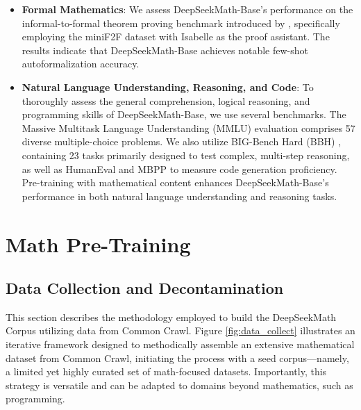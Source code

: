 \begin{itemize}[topsep=0pt]
\item \textbf{Formal Mathematics}: We assess DeepSeekMath-Base’s performance on the informal-to-formal theorem proving benchmark introduced by \citep{dsp_proof}, specifically employing the miniF2F dataset \citep{minif2f} with Isabelle \citep{isabelle} as the proof assistant. The results indicate that DeepSeekMath-Base achieves notable few-shot autoformalization accuracy.
\item \textbf{Natural Language Understanding, Reasoning, and Code}: To thoroughly assess the general comprehension, logical reasoning, and programming skills of DeepSeekMath-Base, we use several benchmarks. The Massive Multitask Language Understanding (MMLU) evaluation \citep{mmlu} comprises 57 diverse multiple-choice problems. We also utilize BIG-Bench Hard (BBH) \citep{bbh}, containing 23 tasks primarily designed to test complex, multi-step reasoning, as well as HumanEval \citep{codex} and MBPP \citep{mbpp} to measure code generation proficiency. Pre-training with mathematical content enhances DeepSeekMath-Base’s performance in both natural language understanding and reasoning tasks.
\end{itemize}

\section{Math Pre-Training}

\subsection{Data Collection and Decontamination} This section describes the methodology employed to build the DeepSeekMath Corpus utilizing data from Common Crawl. Figure \ref{fig:data_collect} illustrates an iterative framework designed to methodically assemble an extensive mathematical dataset from Common Crawl, initiating the process with a seed corpus—namely, a limited yet highly curated set of math-focused datasets. Importantly, this strategy is versatile and can be adapted to domains beyond mathematics, such as programming.

